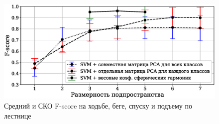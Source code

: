 \documentclass[article,14pt,subf,href,colorlinks=true
]{disser}
\begin{document}
\begin{figure}[H]
    \centering
    \captionsetup{justification=centering,margin=2cm}
    \includegraphics[scale=0.55]{./figs/result_mean.eps}
    \caption{Средний и СКО F-score на ходьбе, беге, спуску и подъему по лестнице}
    \label{fg:clf_result_many}
\end{figure}
\end{document}
